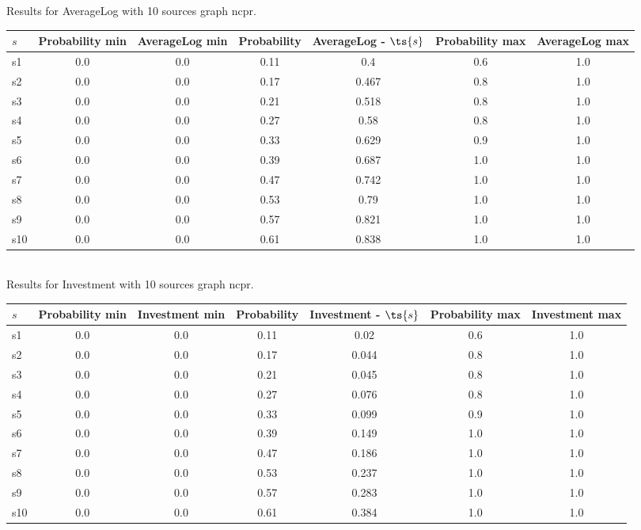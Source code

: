 \documentclass{article}
\begin{document}
\noindent Results for AverageLog with 10 sources graph ncpr.

\noindent\begin{tabular}{|l|c|c|c|c|c|c|}
\hline
$s$& Probability min & AverageLog min & Probability & AverageLog - $\ts{s}$ & Probability max & AverageLog max\\
\hline
s1 &0.0 & 0.0 & 0.11 & 0.4 & 0.6 & 1.0\\
\hline
s2 &0.0 & 0.0 & 0.17 & 0.467 & 0.8 & 1.0\\
\hline
s3 &0.0 & 0.0 & 0.21 & 0.518 & 0.8 & 1.0\\
\hline
s4 &0.0 & 0.0 & 0.27 & 0.58 & 0.8 & 1.0\\
\hline
s5 &0.0 & 0.0 & 0.33 & 0.629 & 0.9 & 1.0\\
\hline
s6 &0.0 & 0.0 & 0.39 & 0.687 & 1.0 & 1.0\\
\hline
s7 &0.0 & 0.0 & 0.47 & 0.742 & 1.0 & 1.0\\
\hline
s8 &0.0 & 0.0 & 0.53 & 0.79 & 1.0 & 1.0\\
\hline
s9 &0.0 & 0.0 & 0.57 & 0.821 & 1.0 & 1.0\\
\hline
s10 &0.0 & 0.0 & 0.61 & 0.838 & 1.0 & 1.0\\
\hline
\end{tabular}\\

\noindent Results for Investment with 10 sources graph ncpr.

\noindent\begin{tabular}{|l|c|c|c|c|c|c|}
\hline
$s$& Probability min & Investment min & Probability & Investment - $\ts{s}$ & Probability max & Investment max\\
\hline
s1 &0.0 & 0.0 & 0.11 & 0.02 & 0.6 & 1.0\\
\hline
s2 &0.0 & 0.0 & 0.17 & 0.044 & 0.8 & 1.0\\
\hline
s3 &0.0 & 0.0 & 0.21 & 0.045 & 0.8 & 1.0\\
\hline
s4 &0.0 & 0.0 & 0.27 & 0.076 & 0.8 & 1.0\\
\hline
s5 &0.0 & 0.0 & 0.33 & 0.099 & 0.9 & 1.0\\
\hline
s6 &0.0 & 0.0 & 0.39 & 0.149 & 1.0 & 1.0\\
\hline
s7 &0.0 & 0.0 & 0.47 & 0.186 & 1.0 & 1.0\\
\hline
s8 &0.0 & 0.0 & 0.53 & 0.237 & 1.0 & 1.0\\
\hline
s9 &0.0 & 0.0 & 0.57 & 0.283 & 1.0 & 1.0\\
\hline
s10 &0.0 & 0.0 & 0.61 & 0.384 & 1.0 & 1.0\\
\hline
\end{tabular}\\
\end{document}
